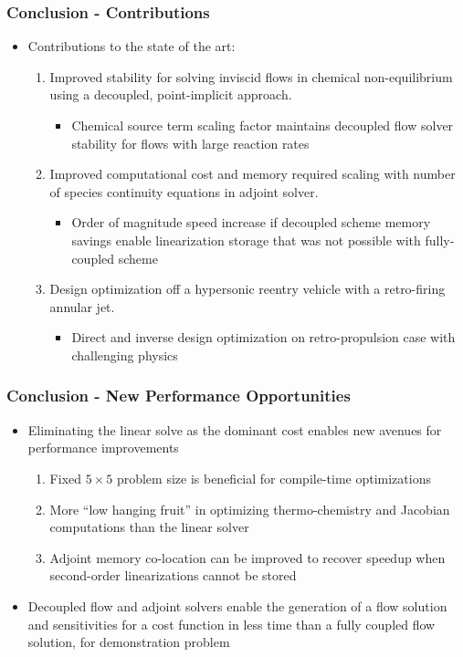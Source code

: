 \documentclass{beamer}
\begin{document}
\begin{frame}
  \frametitle{Conclusion - Contributions}
  \begin{itemize}
    \item Contributions to the state of the art:
      \begin{enumerate}
        \item<1-> Improved stability for solving inviscid flows in chemical
          non-equilibrium using a decoupled, point-implicit approach.
          \begin{itemize}
            \item Chemical source term scaling factor maintains decoupled flow
              solver stability for flows with large reaction rates
          \end{itemize}
        \item<2-> Improved computational cost and memory required scaling with
          number of species continuity equations in adjoint solver.
          \begin{itemize}
            \item Order of magnitude speed increase if decoupled scheme memory
              savings enable linearization storage that was not possible with
              fully-coupled scheme
          \end{itemize}
        \item<3-> Design optimization off a hypersonic reentry vehicle with a
          retro-firing annular jet.
          \begin{itemize}
            \item Direct and inverse design optimization on retro-propulsion
              case with challenging physics
          \end{itemize}
      \end{enumerate}
  \end{itemize}
\end{frame}

\begin{frame}
  \frametitle{Conclusion - New Performance Opportunities}
  \begin{itemize}
    \item Eliminating the linear solve as the dominant cost enables new avenues
      for performance improvements
      \begin{enumerate}
        \item Fixed $5 \times 5$ problem size is beneficial for compile-time
          optimizations
        \item More ``low hanging fruit'' in optimizing thermo-chemistry and
          Jacobian computations than the linear solver
        \item Adjoint memory co-location can be improved to recover speedup when
          second-order linearizations cannot be stored
      \end{enumerate}
    \item Decoupled flow and adjoint solvers enable the generation of a flow
      solution and sensitivities for a cost function in less time than a fully
      coupled flow solution, for demonstration problem
  \end{itemize}
\end{frame}
\end{document}
